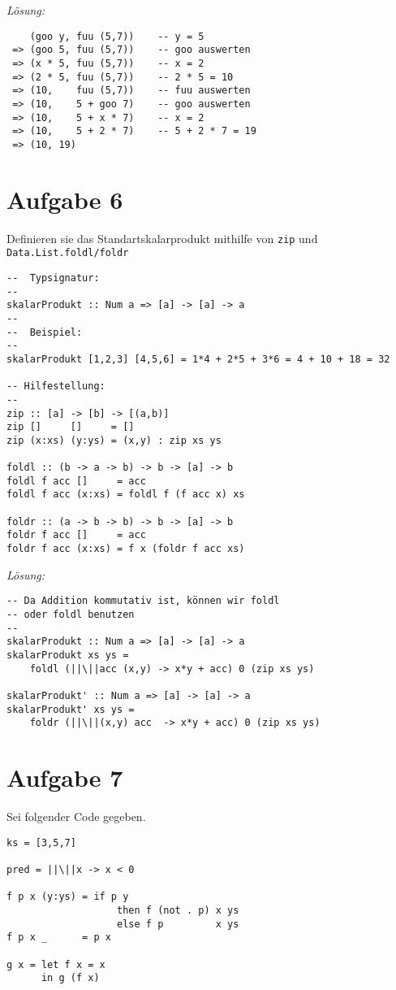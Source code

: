 \documentclass{article}
\begin{document}
\textit{Lösung:}
\begin{mdframed}[backgroundcolor=bg]
    \begin{verbatim}
    (goo y, fuu (5,7))    -- y = 5
 => (goo 5, fuu (5,7))    -- goo auswerten
 => (x * 5, fuu (5,7))    -- x = 2
 => (2 * 5, fuu (5,7))    -- 2 * 5 = 10
 => (10,    fuu (5,7))    -- fuu auswerten
 => (10,    5 + goo 7)    -- goo auswerten
 => (10,    5 + x * 7)    -- x = 2
 => (10,    5 + 2 * 7)    -- 5 + 2 * 7 = 19
 => (10, 19)
    \end{verbatim}
\end{mdframed}

\section*{Aufgabe 6}
Definieren sie das Standartskalarprodukt mithilfe von \texttt{zip} und \texttt{Data.List.foldl/foldr}

\begin{verbatim}
--  Typsignatur:
--
skalarProdukt :: Num a => [a] -> [a] -> a
--
--  Beispiel:
--
skalarProdukt [1,2,3] [4,5,6] = 1*4 + 2*5 + 3*6 = 4 + 10 + 18 = 32

-- Hilfestellung:
--
zip :: [a] -> [b] -> [(a,b)]
zip []     []     = []
zip (x:xs) (y:ys) = (x,y) : zip xs ys

foldl :: (b -> a -> b) -> b -> [a] -> b
foldl f acc []     = acc
foldl f acc (x:xs) = foldl f (f acc x) xs

foldr :: (a -> b -> b) -> b -> [a] -> b
foldr f acc []     = acc
foldr f acc (x:xs) = f x (foldr f acc xs)
\end{verbatim}

\textit{Lösung:}
\begin{mdframed}[backgroundcolor=bg]
    \begin{verbatim}
-- Da Addition kommutativ ist, können wir foldl
-- oder foldl benutzen
--
skalarProdukt :: Num a => [a] -> [a] -> a
skalarProdukt xs ys =
    foldl (||\||acc (x,y) -> x*y + acc) 0 (zip xs ys)

skalarProdukt' :: Num a => [a] -> [a] -> a
skalarProdukt' xs ys =
    foldr (||\||(x,y) acc  -> x*y + acc) 0 (zip xs ys)
    \end{verbatim}
\end{mdframed}

\section*{Aufgabe 7}
Sei folgender Code gegeben.
\begin{verbatim}
ks = [3,5,7]

pred = ||\||x -> x < 0

f p x (y:ys) = if p y
                   then f (not . p) x ys
                   else f p         x ys
f p x _      = p x

g x = let f x = x
      in g (f x)
\end{verbatim}
\end{document}
